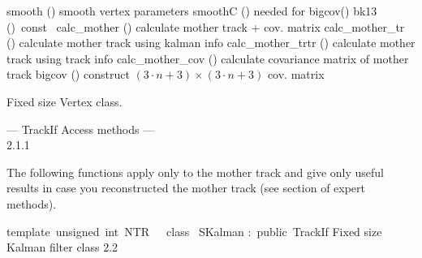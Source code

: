 \documentclass{article}
\begin{document}
\begin{cxxentry}
\begin{cxxclass}
\begin{cxxpublic}
        {smooth}
        {()}
        { smooth vertex parameters}
        {}
\label{cxx.2.1.90}
        {smoothC}
        {()}
        { needed for bigcov()}
        {}
\label{cxx.2.1.91}
        {bk13}
        {()\ const\ }
        {}
        {}
\label{cxx.2.1.92}
        {calc\_mother}
        {()}
        { calculate mother track + cov. matrix}
        {}
\label{cxx.2.1.93}
        {calc\_mother\_tr}
        {()}
        { calculate mother track using kalman info}
        {}
\label{cxx.2.1.94}
        {calc\_mother\_trtr}
        {()}
        { calculate mother track using track info}
        {}
\label{cxx.2.1.95}
        {calc\_mother\_cov}
        {()}
        { calculate covariance matrix of mother track}
        {}
\label{cxx.2.1.96}
        {bigcov}
        {()}
        { construct $(3\cdot n+3)\times(3\cdot n+3)$ cov. matrix}
        {}
\label{cxx.2.1.97}
\end{cxxpublic}
\begin{cxxdoc}
Fixed size Vertex class.


\end{cxxdoc}
\begin{cxxentry}
{}
        {--- TrackIf Access methods ---\\}
        {}
        {}
        {2.1.1}
\begin{cxxdoc}
The following functions apply only to the mother track and give only
useful results in case you reconstructed the mother track (see section of
expert methods). 
\end{cxxdoc}
\end{cxxentry}
\end{cxxclass}
\begin{cxxclass}
{template\ \<unsigned\ int\ NTR\>\ \ \ class\ }
        {SKalman}
        {:\ public\ TrackIf}
        {Fixed size Kalman filter class}
        {2.2}
\begin{cxxInheritance}

\end{cxxInheritance}
\end{cxxclass}
\end{cxxentry}
\end{document}
